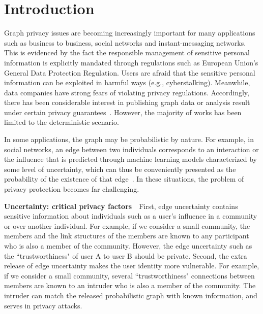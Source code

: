 \section{Introduction}

\label{sec:Intro}
Graph privacy issues are becoming increasingly important for many applications such as business to business, social networks and instant-messaging networks. 
This is evidenced by the fact the responsible management of sensitive personal information is explicitly mandated through regulations such as European Union's General Data Protection Regulation.
Users are afraid that the sensitive personal information can be exploited in harmful ways (e.g., cyberstalking).
Meanwhile, data companies have strong fears of violating privacy regulations. 
Accordingly, there has 
been considerable interest in publishing graph data or analysis result under certain privacy guarantees~\cite{Liu_Towards_2008,Wang2011,Liu_Privacy_2009,Nguyen_Anonymizing_2015,Sala_Sharing_2011,Xiao_Differentially_2014,lee2011}. 
However, the majority of works has been limited to the deterministic scenario. 

In some applications, the graph may be probabilistic by nature. 
For example, in social networks, an edge between two individuals corresponds to an interaction or the influence that is predicted through machine learning models characterized by some level of uncertainty, which can thus be conveniently presented as the probability of the existence of that edge~\cite{Adar_Managing_2007,Kempe_Maximizing_2003}. In these situations, the problem of privacy protection becomes far challenging. 

\textbf{Uncertainty: critical privacy factors}~~First, edge uncertainty contains sensitive information about individuals such as a user's influence in a community or over another individual. 
For example, if we consider a small community, the members and the link structures of the members are known to any participant who is also a member of the community. However, the edge uncertainty such as the ``trustworthiness" of user A to user B should be private.
Second, the extra release of edge uncertainty makes the user identity more vulnerable. 
For example, if we consider a small community, several ``trustworthiness" connections between members are known to an intruder who is also a member of the community. The intruder can match the released probabilistic graph with known information, and serves in privacy attacks.  

